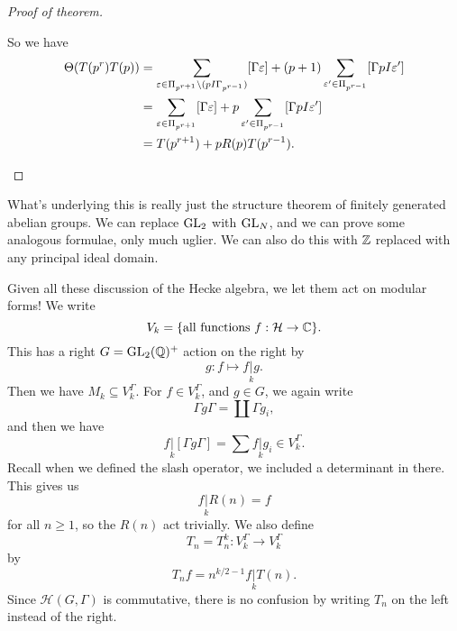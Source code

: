 \documentclass[a4paper]{article}
\renewcommand{\H}{\mathcal{H}}
\begin{document}
\begin{proof}[Proof of theorem]
\begin{enumerate}
      So we have
      \begin{align*}
        \Theta(T(p^r)T(p)) &= \sum_{\varepsilon \in \Pi_{p^{r + 1}} \setminus (pI \Gamma_{p^{r - 1}})} [\Gamma \varepsilon] + (p + 1) \sum_{\varepsilon' \in \Pi_{p^{r - 1}}} [\Gamma pI \varepsilon']\\
        &= \sum_{\varepsilon \in \Pi_{p^{r + 1}}} [\Gamma \varepsilon] + p \sum_{\varepsilon' \in \Pi_{p^{r - 1}}} [\Gamma pI \varepsilon'] \\
        &= T(p^{r + 1}) + p R(p) T(p^{r - 1}).\qedhere
      \end{align*}%
  \end{enumerate}
\end{proof}
What's underlying this is really just the structure theorem of finitely generated abelian groups. We can replace $\mathrm{GL}_2$ with $\mathrm{GL}_N$, and we can prove some analogous formulae, only much uglier. We can also do this with $\mathbb{Z}$ replaced with any principal ideal domain.

Given all these discussion of the Hecke algebra, we let them act on modular forms! We write
\[
  V_k = \{\text{all functions } f: \H \to \C\}.
\]
This has a right $G = \mathrm{GL}_2(\mathbb{Q})^+$ action on the right by
\[
  g: f \mapsto f \underset{k}{|}g.
\]
Then we have $M_k \subseteq V_k^\Gamma$. For $f \in V_k^\Gamma$, and $g \in G$, we again write
\[
  \Gamma g \Gamma = \coprod \Gamma g_i,
\]
and then we have
\[
  f \underset{k}{|} [\Gamma g \Gamma] = \sum f\underset{k}{|}g_i \in V_k^\Gamma.
\]
Recall when we defined the slash operator, we included a determinant in there. This gives us
\[
  f\underset{k}{|} R(n) = f
\]
for all $n \geq 1$, so the $R(n)$ act trivially. We also define
\[
  T_n = T_n^k: V_k^\Gamma \to V_k^\Gamma
\]
by
\[
  T_n f = n^{k/2 - 1} f \underset{k}{|} T(n).
\]
Since $\mathcal{H}(G, \Gamma)$ is commutative, there is no confusion by writing $T_n$ on the left instead of the right.
\end{document}
